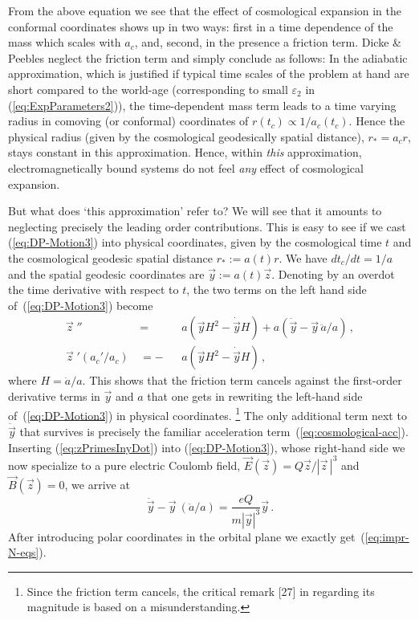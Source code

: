\documentclass
[rmp,aps,twocolumn,showpacs,preprintnumbers,amsmath,amssymb]{revtex4}
\theoremstyle{plain}
\theoremstyle{definition}
\theoremstyle{remark}
\newcommand{\sss}{\scriptscriptstyle}
\newcommand{\vecp}[1]{{\vec #1}\;\!'}         %
\newcommand{\vecpp}[1]{{\vec #1}\;\!''}       %
\begin{document}
From the above equation we see that the effect of cosmological expansion
in the conformal coordinates shows up in two ways: first in a time 
dependence of the mass which scales with $a_c$, and, second, in the
presence a friction term. Dicke \& Peebles neglect the friction term
and simply conclude as follows: In the adiabatic approximation, which 
is justified if typical time scales of the problem at hand are short 
compared to the world-age (corresponding to small $\varepsilon_{\sss 2}$ 
in (\ref{eq:ExpParameters2})), the time-dependent mass term leads to a 
time varying radius in comoving (or conformal) coordinates of 
$r(t_c)\propto 1/a_c(t_c)$. Hence the physical radius (given by the 
cosmological geodesically spatial distance), $r_*=a_c r$, stays 
constant in this approximation. Hence, within \emph{this} 
approximation, electromagnetically bound systems do not feel 
\emph{any} effect of cosmological expansion.

But what does `this approximation' refer to? We will see that it amounts 
to neglecting precisely the leading order contributions. This is easy to
see if we cast (\ref{eq:DP-Motion3}) into  physical coordinates, 
given by the cosmological time $t$ and the cosmological geodesic 
spatial distance $r_*:=a(t)r$. We have $dt_c/dt=1/a$ 
and the spatial geodesic coordinates are $\vec y:= a(t) \vec z$. 
Denoting by an overdot the time derivative with respect to $t$, 
the two terms on the left hand side of~(\ref{eq:DP-Motion3}) become
%
\begin{subequations}\label{eq:zPrimesInyDot}
\begin{alignat}{2}
\label{eq:zPrimesInyDot-a}
  \vecpp z&\,=&&a(\vec y H^2 - \dot{\vec y}H) + 
                a(\ddot{\vec y} - \vec y\,\ddot a/a)\,,\\
\label{eq:zPrimesInyDot-b}
  \vecp z(a_c'/a_c) &\,=-&&a(\vec yH^2-\dot{\vec y}H)\,,
\end{alignat}
\end{subequations}
%
where $H=\dot a/a$. This shows that the friction term cancels against the 
first-order derivative terms in $\vec y$ and $a$ that one gets in rewriting 
the left-hand side of~(\ref{eq:DP-Motion3}) in physical coordinates.%
\footnote{Since the friction term cancels, the critical 
remark [27] in \cite{Adkins.etal:2007} regarding its magnitude is based 
on a misunderstanding.} 
The only additional term next to $\ddot{\vec y}$ that survives is precisely 
the familiar acceleration term~(\ref{eq:cosmological-acc}). Inserting 
(\ref{eq:zPrimesInyDot}) into (\ref{eq:DP-Motion3}), whose right-hand side 
we now specialize to a pure electric Coulomb field, 
$\vec E(\vec{z})=Q\vec{z}/|\vec{z}\,|^3$ and $\vec B(\vec{z}) = 0$, we 
arrive at 
%
\begin{equation}\label{eq:DP-Motion4}
  \ddot{{\vec y}} - \vec{y}\ (\ddot a/a) = \frac{eQ}{m |\vec{y}|^3}\vec{y} \,.
\end{equation}
%
After introducing polar coordinates in the orbital plane we exactly 
get~(\ref{eq:impr-N-eqs}).
\end{document}
